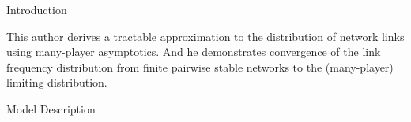 \documentclass{beamer}		%
\begin{document}



\begin{frame}{Introduction}

This author derives a tractable approximation to the distribution of network links using many-player asymptotics. And he demonstrates convergence of the link frequency distribution from finite pairwise stable networks to the (many-player) limiting distribution. 


\end{frame}






\begin{frame}[noframenumbering]

\begin{itemize}

    \begin{LARGE}
    
    \item {}
    
    \item Model Description
    
    \item {}
    
    \item {}

    \end{LARGE}
    
\end{itemize}
	
\end{frame}
\end{document}
